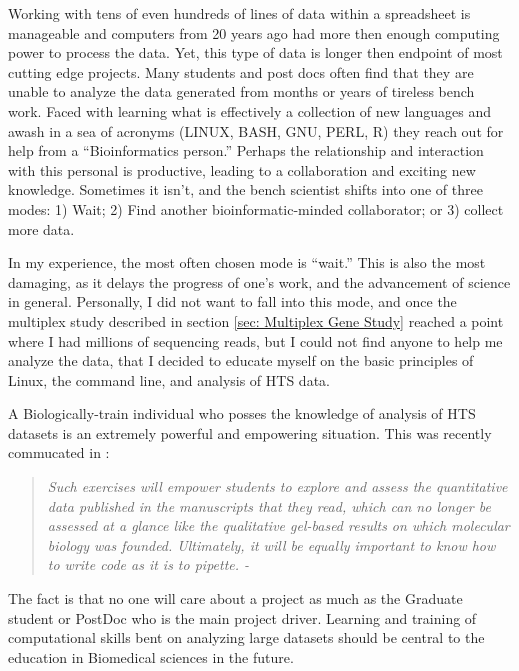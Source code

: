 {{    Working with tens of even hundreds of lines of data within a spreadsheet is manageable and computers from 20 years ago had more then enough computing power to process the data. Yet, this type of data is longer then endpoint of most cutting edge projects. Many students and post docs often find that they are unable to analyze the data generated from months or years of tireless bench work. Faced with learning what is effectively a collection of new languages and awash in a sea of acronyms (LINUX, BASH, GNU, PERL, R) they reach out for help from a ``Bioinformatics person.'' Perhaps the relationship and interaction with this personal is productive, leading to a collaboration and exciting new knowledge. Sometimes it isn't, and the bench scientist shifts into one of three modes: 1) Wait; 2) Find another bioinformatic-minded collaborator; or 3) collect more data.

    In my experience, the most often chosen mode is ``wait.'' This is also the most damaging, as it delays the progress of one's work, and the advancement of science in general. Personally, I did not want to fall into this mode, and once the multiplex study described in section \ref{sec: Multiplex Gene Study} reached a point where I had millions of sequencing reads, but I could not find anyone to help me analyze the data, that I decided to educate myself on the basic principles of Linux, the command line, and analysis of HTS data.

    A Biologically-train individual who posses the knowledge of analysis of HTS datasets is an extremely powerful and empowering situation. This was recently commucated in \citet{Plocik2013}:

    \begin{quote} %
      \itshape 
      Such exercises will empower students to explore and assess the quantitative data published in the manuscripts that they read, which can no longer be assessed at a glance like the qualitative gel-based results on which molecular biology was founded. Ultimately, it will be equally important to know how to write code as it is to pipette. - \citep{Plocik2013}
      \singlespacing
      \end{quote}

    The fact is that no one will care about a project as much as the Graduate student or PostDoc who is the main project driver. Learning and training of computational skills bent on analyzing large datasets should be central to the education in Biomedical sciences in the future.

}}
